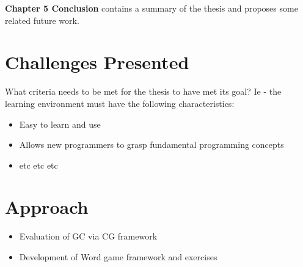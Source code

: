 
\textbf{Chapter 5 Conclusion} contains a summary of the thesis and proposes some related future work.

\section{Challenges Presented}

What criteria needs to be met for the thesis to have met its goal?  Ie - the learning environment must have the following characteristics:

\begin{itemize}
	\item Easy to learn and use
	\item Allows new programmers to grasp fundamental programming concepts
	\item etc etc etc
\end{itemize}

\section{Approach}

\begin{itemize}
	\item Evaluation of GC via CG framework
	\item Development of Word game framework and exercises
\end{itemize}


\begin{comment}
Why is this thesis useful?

Programming is hard, students new to programming often struggle to cope with the complexities of software development.

Declining enrollment, syntax errors discourage students early and thus they leave computer science before they've
gotten anywhere in the discipline...

It has been theorized that visual programming environments (VPE's) help to alleviate some of the early frustrations
associated with learning to program.  Many examples include Alice, Scratch, FIXME more...., however, very few have
been proposed that fall into the functional programming paradigm.  Why FP?
\end{comment}